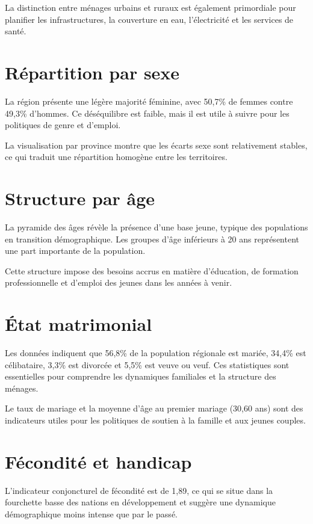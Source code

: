 \documentclass[12pt,a4paper,oneside]{report}
\begin{document}
La distinction entre ménages urbains et ruraux est également primordiale pour planifier les infrastructures, la couverture en eau, l'électricité et les services de santé.

\section{Répartition par sexe}

La région présente une légère majorité féminine, avec 50,7\% de femmes contre 49,3\% d'hommes. Ce déséquilibre est faible, mais il est utile à suivre pour les politiques de genre et d'emploi.

La visualisation par province montre que les écarts sexe sont relativement stables, ce qui traduit une répartition homogène entre les territoires.

\section{Structure par âge}

La pyramide des âges révèle la présence d'une base jeune, typique des populations en transition démographique. Les groupes d'âge inférieurs à 20 ans représentent une part importante de la population.

Cette structure impose des besoins accrus en matière d'éducation, de formation professionnelle et d'emploi des jeunes dans les années à venir.

\section{État matrimonial}

Les données indiquent que 56,8\% de la population régionale est mariée, 34,4\% est célibataire, 3,3\% est divorcée et 5,5\% est veuve ou veuf. Ces statistiques sont essentielles pour comprendre les dynamiques familiales et la structure des ménages.

Le taux de mariage et la moyenne d'âge au premier mariage (30,60 ans) sont des indicateurs utiles pour les politiques de soutien à la famille et aux jeunes couples.

\section{Fécondité et handicap}

L'indicateur conjoncturel de fécondité est de 1,89, ce qui se situe dans la fourchette basse des nations en développement et suggère une dynamique démographique moins intense que par le passé.
\end{document}
